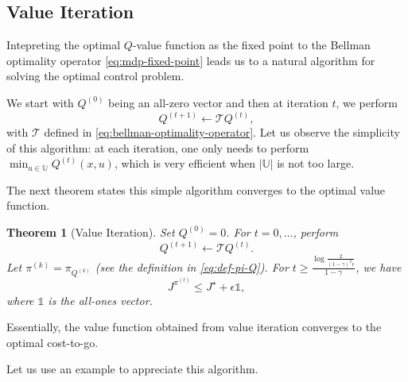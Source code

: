\documentclass[
]{book}
\newtheorem{theorem}{Theorem}[chapter]
\theoremstyle{definition}
\theoremstyle{definition}
\theoremstyle{definition}
\theoremstyle{definition}
\theoremstyle{remark}
\begin{document}
\hypertarget{value-iteration}{%
\subsection{Value Iteration}\label{value-iteration}}

Intepreting the optimal \(Q\)-value function as the fixed point to the Bellman optimality operator \eqref{eq:mdp-fixed-point} leads us to a natural algorithm for solving the optimal control problem.

We start with \(Q^{(0)}\) being an all-zero vector and then at iteration \(t\), we perform
\[
Q^{(t+1)} \leftarrow \mathcal{T} Q^{(t)},
\]
with \(\mathcal{T}\) defined in \eqref{eq:bellman-optimality-operator}. Let us observe the simplicity of this algorithm: at each iteration, one only needs to perform \(\min_{u \in \mathbb{U}} Q^{(t)}(x,u)\), which is very efficient when \(|\mathbb{U}|\) is not too large.

The next theorem states this simple algorithm converges to the optimal value function.

\begin{theorem}[Value Iteration]
\protect\hypertarget{thm:valueiteration}{}\label{thm:valueiteration}Set \(Q^{(0)} = 0\). For \(t=0,\dots\), perform
\[
Q^{(t+1)} \leftarrow \mathcal{T} Q^{(t)}.
\]
Let \(\pi^{(k)} = \pi_{Q^{(k)}}\) (see the definition in \eqref{eq:def-pi-Q}). For \(t \geq \frac{\log \frac{2}{(1-\gamma)^2 \epsilon}}{1-\gamma}\), we have
\[
J^{\pi^{(t)}} \leq J^\star + \epsilon \mathbb{1},
\]
where \(\mathbb{1}\) is the all-ones vector.
\end{theorem}

Essentially, the value function obtained from value iteration converges to the optimal cost-to-go.

Let us use an example to appreciate this algorithm.
\end{document}
